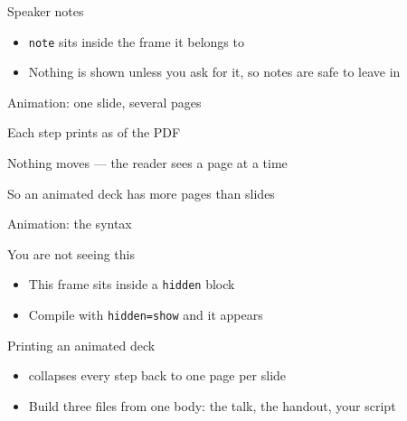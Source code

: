 \documentclass[11pt,aspectratio=43]{beamer}
\newcommand{\howto}[1]{}
\begin{document}
\begin{frame}[allowframebreaks]{Speaker notes}
  \begin{itemize}
    \item \texttt{note} sits inside the frame it belongs to
    \item Nothing is shown unless you ask for it, so notes are safe to leave in
  \end{itemize}
  \howto{notes}
\end{frame}

\begin{frame}{Animation: one slide, several pages}
  \begin{steps}
    \item Each step prints as  of the PDF
    \item Nothing moves --- the reader sees a page at a time
    \item So an animated deck has more pages than slides
  \end{steps}
\end{frame}

\begin{frame}[allowframebreaks]{Animation: the syntax}
  \howto{animation}
\end{frame}

\begin{hidden}
\begin{frame}{You are not seeing this}
  \begin{itemize}
    \item This frame sits inside a \texttt{hidden} block
    \item Compile with \texttt{hidden=show} and it appears
  \end{itemize}
\end{frame}
\end{hidden}

\begin{frame}[allowframebreaks]{Printing an animated deck}
  \begin{itemize}
    \item {} collapses every step back to one page per slide
    \item Build three files from one body: the talk, the handout, your script
  \end{itemize}
  \howto{handout}
\end{frame}
\end{document}

